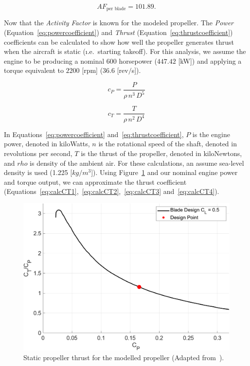\documentclass[12pt]{report}
\begin{document}
\begin{equation}\label{eq:activityfactorcalc2}
  AF_{\textrm{per blade}} = 101.89.
\end{equation}

Now that the \textit{Activity Factor} is known for the modeled propeller. The \textit{Power} (Equation~\ref{eq:powercoefficient}) and \textit{Thrust} (Equation~\ref{eq:thrustcoefficient}) coefficients can be calculated to show how well the propeller generates thrust when the aircraft is static (\i.e.\ starting takeoff). For this analysis, we assume the engine to be producing a nominal \(600\) horsepower (\(447.42\) [kW]) and applying a torque equivalent to \(2200\) [rpm] (\(36.6\) [rev\(/\)s]).

\begin{equation}\label{eq:powercoefficient}
  c_P = \frac{P}{\rho \, n^3 \, D^5}
\end{equation}

\begin{equation}\label{eq:thrustcoefficient}
  c_T = \frac{T}{\rho \, n^2 \, D^4}
\end{equation}

In Equations~\ref{eq:powercoefficient} and~\ref{eq:thrustcoefficient}, \(P\) is the engine power, denoted in kiloWatts, \(n\) is the rotational speed of the shaft, denoted in revolutions per second, \(T\) is the thrust of the propeller, denoted in kiloNewtons, and \( rho \) is density of the ambient air. For these calculations, an assume sea-level density is used (1.225 [\(kg/m^3\)]). Using Figure~\ref{fig:staticpropthrust} and our nominal engine power and torque output, we can approximate the thrust coefficient (Equations~\ref{eq:calcCT1},~\ref{eq:calcCT2},~\ref{eq:calcCT3} and~\ref{eq:calcCT4}).

\begin{figure}[!ht]\label{fig:staticpropthrust}
  \centering
  \includegraphics[width=0.85\linewidth]{Figures/StaticThrust.png}
  \caption{Static propeller thrust for the modelled propeller (Adapted from~\cite{GeneralizedMethodPropeller}).}
\end{figure}
\end{document}
